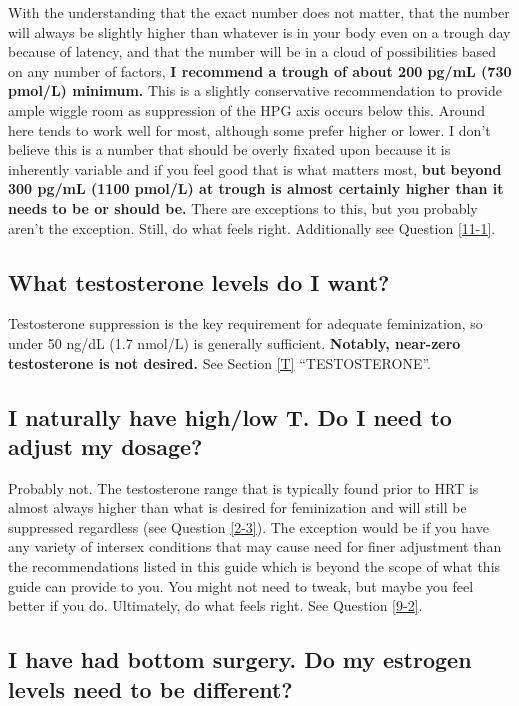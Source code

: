 \documentclass{article}
\begin{document}
With the understanding that the exact number does not matter, that the number will always be slightly higher than whatever is in your body even on a trough day because of latency, and that the number will be in a cloud of possibilities based on any number of factors, \textbf{I recommend a trough of about 200 pg/mL (730 pmol/L) minimum.} This is a slightly conservative recommendation to provide ample wiggle room as suppression of the HPG axis occurs below this. Around here tends to work well for most, although some prefer higher or lower. I don’t believe this is a number that should be overly fixated upon because it is inherently variable and if you feel good that is what matters most, \textbf{but} \textbf{beyond 300 pg/mL (1100 pmol/L) at trough is almost certainly higher than it needs to be or should be.} There are exceptions to this, but you probably aren't the exception. Still, do what feels right. Additionally see Question \ref{11-1}.

\subsection{What testosterone levels do I want?}

Testosterone suppression is the key requirement for adequate feminization, so under 50 ng/dL (1.7 nmol/L) is generally sufficient. \textbf{Notably, near-zero testosterone is not desired.} See Section \ref{T} “TESTOSTERONE”.

\subsection{I naturally have high/low T. Do I need to adjust my dosage?}

Probably not. The testosterone range that is typically found prior to HRT is almost always higher than what is desired for feminization and will still be suppressed regardless (see Question \ref{2-3}). The exception would be if you have any variety of intersex conditions that may cause need for finer adjustment than the recommendations listed in this guide which is beyond the scope of what this guide can provide to you. You might not need to tweak, but maybe you feel better if you do. Ultimately, do what feels right. See Question \ref{9-2}.

\subsection{I have had bottom surgery. Do my estrogen levels need to be different?}
\end{document}

